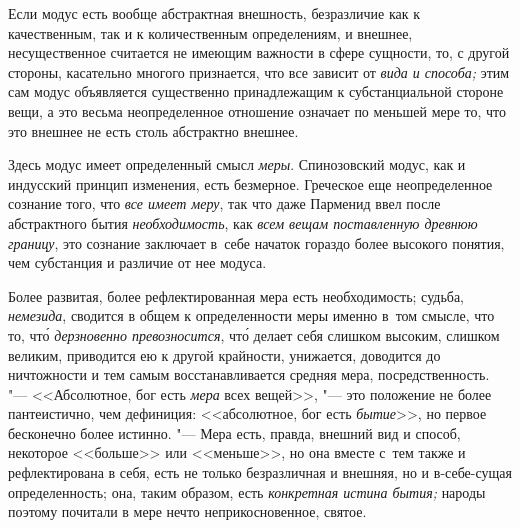 Если модус есть вообще абстрактная внешность, безразличие как к качественным,
так и к количественным определениям, и внешнее, несущественное считается не
имеющим важности в сфере сущности, то, с другой стороны, касательно многого
признается, что все зависит от {\em вида и способа;} этим сам модус объявляется
существенно принадлежащим к субстанциальной стороне вещи, а это весьма
неопределенное отношение означает по меньшей мере то, что это внешнее не есть
столь абстрактно внешнее.

Здесь модус имеет определенный смысл {\em меры}. Спинозовский модус,
как и индусский принцип изменения, есть безмерное. Греческое еще
неопределенное сознание того, что {\em все имеет меру}, так что даже
Парменид ввел после абстрактного бытия {\em необходимость}, как
{\em всем вещам поставленную древнюю границу}, это сознание
заключает в~себе начаток гораздо более высокого понятия, чем
субстанция и различие от нее модуса.

Более развитая, более рефлектированная мера есть необходимость; судьба,
{\em немезида}, сводится в общем к определенности меры именно в~том смысле,
что то, чт\'{о} {\em дерзновенно превозносится}, чт\'{о} делает себя слишком
высоким, слишком великим, приводится ею к другой крайности, унижается,
доводится до ничтожности и тем самым восстанавливается средняя мера,
посредственность. "--- <<Абсолютное, бог есть {\em мера} всех вещей>>, "--- это
положение не более пантеистично, чем дефиниция: <<абсолютное, бог есть
{\em бытие}>>, но первое бесконечно более истинно. "--- Мера есть, правда,
внешний вид и способ, некоторое <<больше>> или <<меньше>>, но она вместе с~тем
также и рефлектирована в себя, есть не только безразличная и внешняя, но и
в-себе-сущая определенность; она, таким образом, есть {\em конкретная истина
бытия;} народы поэтому почитали в мере нечто неприкосновенное, святое.

